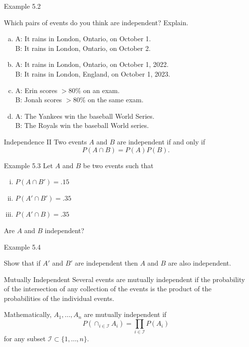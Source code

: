 \documentclass[aspectratio=169,xcolor=pdftex,dvipsnames,table]{beamer}\usepackage[]{graphicx}\usepackage[]{xcolor}
\begin{document}
\begin{frame}{Example 5.2}
  
    Which pairs of events do you think are independent? Explain.

    \begin{enumerate}[a)]
    \item A: It rains in London, Ontario, on October 1.\\
      B: It rains in London, Ontario, on October 2.
    \item A: It rains in London, Ontario, on October 1, 2022.\\
      B: It rains in London, England, on October 1, 2023.
    \item A: Erin scores $>80\%$ on an exam.\\
      B: Jonah scores $>80\%$ on the same exam.
    \item A: The Yankees win the baseball World Series.\\
      B: The Royals win the baseball World series.
    \end{enumerate}

\end{frame}

\begin{frame}{Independence II}
  Two events $A$ and $B$ are independent if and only if
  \[
    P(A \cap B) = P(A) P(B).
  \]
\end{frame}

\begin{frame}{Example 5.3}
  Let $A$ and $B$ be two events such that
  \begin{enumerate}[i)]
  \item $P(A \cap B')=.15$
  \item $P(A' \cap B')=.35$
  \item $P(A' \cap B)=.35$
  \end{enumerate}

  \medskip

  Are $A$ and $B$ independent?
\end{frame}

\begin{frame}{Example 5.4}

Show that if $A'$ and $B'$ are independent then $A$ and $B$ are also independent. 

\end{frame}

\begin{frame}{Mutually Independent}
  Several events are mutually independent if the probability of the intersection of any collection of the events is the product of the probabilities of the individual events.

  \bigskip

  Mathematically, $A_1,\ldots,A_n$ are mutually independent if
  \[
    P(\cap_{i \in \mathcal I} A_i)=\prod_{i \in \mathcal I} P(A_i)
  \]
  for any subset $\mathcal I \subset \{1,\ldots,n\}$. 
\end{frame}
\end{document}
